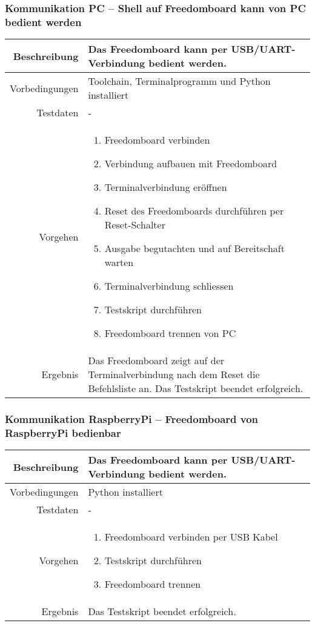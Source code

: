 \subsubsection{Kommunikation PC -- Shell auf Freedomboard kann von PC bedient werden}
\begin{table}[h!]
	\renewcommand{\arraystretch}{1.5}
	\begin{tabular}{|r|p{14cm}|}
		\hline Beschreibung	&
			Das Freedomboard kann per USB/UART-Verbindung bedient werden. \\ 
		\hline Vorbedingungen	&
			Toolchain, Terminalprogramm und Python installiert \\ 
		\hline Testdaten	& - \\ 
		\hline Vorgehen		& 
		\begin{enumerate}
			\item Freedomboard verbinden
			\item Verbindung aufbauen mit Freedomboard
			\item Terminalverbindung eröffnen
			\item Reset des Freedomboards durchführen per Reset-Schalter
			\item Ausgabe begutachten und auf Bereitschaft warten
			\item Terminalverbindung schliessen
			\item Testskript durchführen
			\item Freedomboard trennen von PC 
		\end{enumerate} \\ 
		\hline Ergebnis 	&
			Das Freedomboard zeigt auf der Terminalverbindung nach dem
			Reset die Befehlsliste an. Das Testskript beendet erfolgreich.\\ 
		\hline 
	\end{tabular}
\end{table}

\newpage
\subsubsection{Kommunikation RaspberryPi -- Freedomboard von RaspberryPi bedienbar}
\begin{table}[h!]
	\renewcommand{\arraystretch}{1.5}
	\begin{tabular}{|r|p{14cm}|}
		\hline Beschreibung	&
			Das Freedomboard kann per USB/UART-Verbindung bedient werden. \\ 
		\hline Vorbedingungen	& Python installiert \\ 
		\hline Testdaten	& - \\ 
		\hline Vorgehen		& 
		\begin{enumerate}
			\item Freedomboard verbinden per USB Kabel
			\item Testskript durchführen
			\item Freedomboard trennen
		\end{enumerate} \\ 
		\hline Ergebnis 	&
			Das Testskript beendet erfolgreich.\\ 
		\hline 
	\end{tabular}
\end{table}

